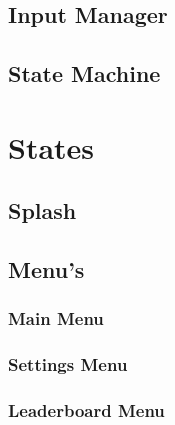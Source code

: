 \documentclass{report}
\begin{document}

  \section{Input Manager} %
  \label{sec:input_manager}


  \section{State Machine} %
  \label{sec:state_machine}


\chapter{States} %
\label{cha:states}

  \section{Splash} %
  \label{sec:splash}


  \section{Menu's} %
  \label{sec:menu_s}

    \subsection{Main Menu} %
    \label{sub:main_menu}


    \subsection{Settings Menu} %
    \label{sub:settings_menu}


    \subsection{Leaderboard Menu} %
    \label{sub:leaderboard_menu}

\end{document}
